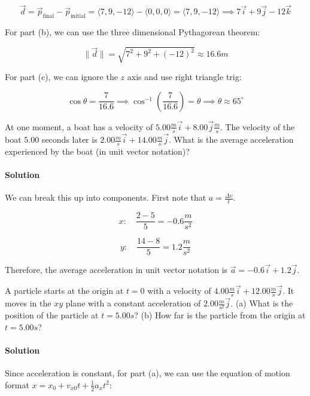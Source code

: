 \documentclass{scrartcl}
\theoremstyle{definition}
\begin{document}
	$$
	\vec{d} = \vec{p}_\text{final} - \vec{p}_\text{initial} = \langle 7,  9, -12 \rangle - \langle 0,0,0 \rangle = \langle 7, 9, -12 \rangle \implies 7 \vec{i} + 9 \vec{j} - 12 \vec{k}
	$$
	
	\noindent For part (b), we can use the three dimensional Pythagorean theorem:
	
	$$
	\| \vec{d} \| = \sqrt{7^2 + 9^2 + (-12)^2} \approx 16.6 m
	$$
	
	\noindent For part (c), we can ignore the $z$ axis and use right triangle trig:
	
	$$
	\cos \theta = \frac{7}{16.6} \implies \cos^{-1} \left(\frac{7}{16.6} \right) = \theta \implies \theta \approx 65^\circ
	$$
	
	\begin{example}
		At one moment, a boat has a velocity of $5.00 \frac{m}{s} \vec{i} + 8.00 \vec{j} \frac{m}{s}$. The velocity of the boat $5.00$ seconds later is $2.00 \frac{m}{s} \vec{i} + 14.00 \frac{m}{s} \vec{j}$. What is the average acceleration experienced by the boat (in unit vector notation)?
	\end{example}
	
	\paragraph{Solution} We can break this up into components. First note that $a = \frac{\Delta v}{t}$.
	
	$$
	x: \quad \frac{2 - 5}{5} = -0.6 \frac{m}{s^2}
	$$
	
	$$
	y: \quad \frac{14-8}{5} = 1.2 \frac{m}{s^2}
	$$
	
	\noindent Therefore, the average acceleration in unit vector notation is $\vec{a} = -0.6 \vec{i} + 1.2 \vec{j}$.
	
	\begin{example}
		A particle starts at the origin at $t=0$ with a velocity of $4.00 \frac{m}{s} \vec{i} + 12.00 \frac{m}{s} \vec{j}$. It moves in the $xy$ plane with a constant acceleration of $2.00 \frac{m}{s^2} \vec{j}$. (a) What is the position of the particle at $t = 5.00s$? (b) How far is the particle from the origin at $t = 5.00s$?
	\end{example}
	
	\paragraph{Solution} Since acceleration is constant, for part (a), we can use the equation of motion format $x = x_0 + v_{x0} t + \frac{1}{2} a_x t^2$:
	
\end{document}
